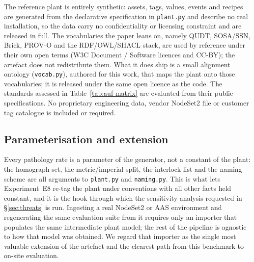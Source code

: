 The reference plant is entirely synthetic: assets, tags, values, events and
recipes are generated from the declarative specification in \texttt{plant.py} and
describe no real installation, so the data carry no confidentiality or licensing
constraint and are released in full. The vocabularies the paper leans on, namely
QUDT, SOSA/SSN, Brick, PROV-O and the RDF/OWL/SHACL stack, are used by reference
under their own open terms (W3C Document / Software licences and CC-BY); the
artefact does not redistribute them. What it does ship is a small alignment
ontology (\texttt{vocab.py}), authored for this work, that maps the plant onto
those vocabularies; it is released under the same open licence as the code. The
standards assessed in Table~\ref{tab:auf-matrix} are evaluated from their public
specifications. No proprietary engineering data, vendor NodeSet2 file or customer
tag catalogue is included or required.

\subsection{Parameterisation and extension}

Every pathology rate is a parameter of the generator, not a constant of the
plant: the homograph set, the metric/imperial split, the interlock list and the
naming scheme are all arguments to \texttt{plant.py} and \texttt{naming.py}. This
is what lets Experiment~E8 re-tag the plant under \NSchemes{} conventions with
all other facts held constant, and it is the hook through which the sensitivity
analysis requested in \S\ref{sec:threats} is run. Ingesting a real \opcua{}
NodeSet2 or AAS environment and regenerating the same evaluation suite from it
requires only an importer that populates the same intermediate plant model; the
rest of the pipeline is agnostic to how that model was obtained. We regard that
importer as the single most valuable extension of the artefact and the clearest
path from this benchmark to on-site evaluation.
